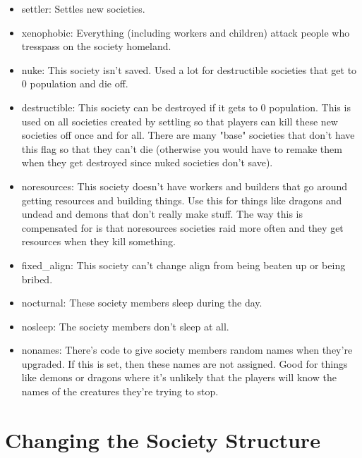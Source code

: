 \begin{itemize}
\begin{itemize}
\item settler: Settles new societies.

\item xenophobic: Everything (including workers and children) attack 
people who tresspass on the society homeland.

\item nuke: This society isn't saved. Used a lot for destructible
societies that get to 0 population and die off.

\item destructible: This society can be destroyed if it gets to 0 population.
This is used on all societies created by settling so that players can
kill these new societies off once and for all. There are many "base"
societies that don't have this flag so that they can't die 
(otherwise you would have to remake them when they get destroyed
since nuked societies don't save).

\item noresources: This society doesn't have workers and builders that go
  around getting resources and building things. Use this for things like
dragons and undead and demons that don't really make stuff. The way
this is compensated for is that noresources societies raid more
often and they get resources when they kill something.

\item fixed\_align: This society can't change align from being beaten up or
  being bribed.

\item nocturnal: These society members sleep during the day.

\item nosleep: The society members don't sleep at all.

\item nonames: There's code to give society members random names when
they're upgraded. If this is set, then these names are not assigned.
Good for things like demons or dragons where it's unlikely that the
players will know the names of the creatures they're trying to stop.

\end{itemize}

\end{itemize}

\section{Changing the Society Structure}

